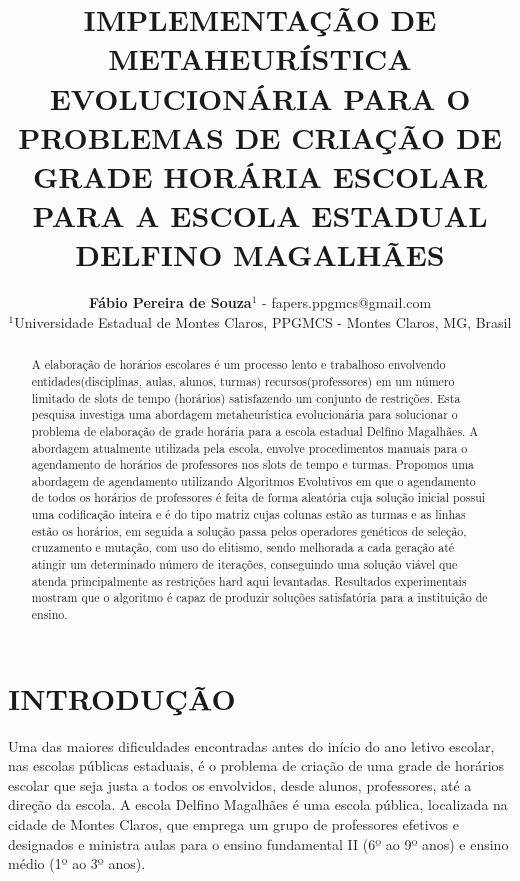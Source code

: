 \documentclass[12pt,fleqn]{article}
\title{IMPLEMENTAÇÃO DE METAHEURÍSTICA EVOLUCIONÁRIA PARA O PROBLEMAS DE CRIAÇÃO DE GRADE HORÁRIA ESCOLAR PARA A ESCOLA ESTADUAL DELFINO MAGALHÃES}
\author
    {\rm \begin{tabular}{l} 
    \textbf{Fábio Pereira de Souza}$^{1}$ - {\textnormal fapers.ppgmcs@gmail.com}\\%
    {\fontsize{11}{0}\selectfont $^{1}$Universidade Estadual de Montes Claros, PPGMCS - Montes Claros, MG, Brasil} %
  \end{tabular}}
\begin{document}
\maketitle

\thispagestyle{firspagetstyle}

\renewcommand{\headrulewidth}{0.0pt}
\rhead{}

\begin{abstract}
  A elaboração de horários escolares é um processo lento e trabalhoso envolvendo entidades(disciplinas, aulas, alunos, turmas) recursos(professores) em um número limitado de slots de tempo (horários) satisfazendo um conjunto de restrições. Esta pesquisa investiga uma abordagem metaheurística evolucionária para solucionar o problema de elaboração de grade horária para a escola estadual Delfino Magalhães. A abordagem atualmente utilizada pela escola, envolve procedimentos manuais para o agendamento de horários de professores nos slots de tempo e turmas. Propomos uma abordagem de agendamento utilizando Algoritmos Evolutivos em que o agendamento de todos os horários de professores é feita de forma aleatória cuja solução inicial possui uma codificação inteira e é do tipo matriz cujas colunas estão as turmas e as linhas estão os horários, em seguida a solução passa pelos operadores genéticos de seleção, cruzamento e mutação, com uso do elitismo, sendo melhorada a cada geração até atingir um determinado número de iterações, conseguindo uma solução viável que atenda principalmente as restrições hard aqui levantadas. Resultados experimentais mostram que o algoritmo é capaz de produzir soluções satisfatória para a instituição de ensino.
\end{abstract}


\pagestyle{fancy}

\section{INTRODUÇÃO}
Uma das maiores dificuldades encontradas antes do início do ano letivo escolar, nas escolas públicas estaduais, é o problema de criação de uma grade de horários escolar que seja justa a todos os envolvidos, desde alunos, professores, até a direção da escola. A escola Delfino Magalhães é uma escola pública, localizada na cidade de Montes Claros, que emprega um grupo de professores efetivos e designados e ministra aulas para o ensino fundamental II (6º ao 9º anos) e ensino médio (1º ao 3º anos). 
\end{document}
